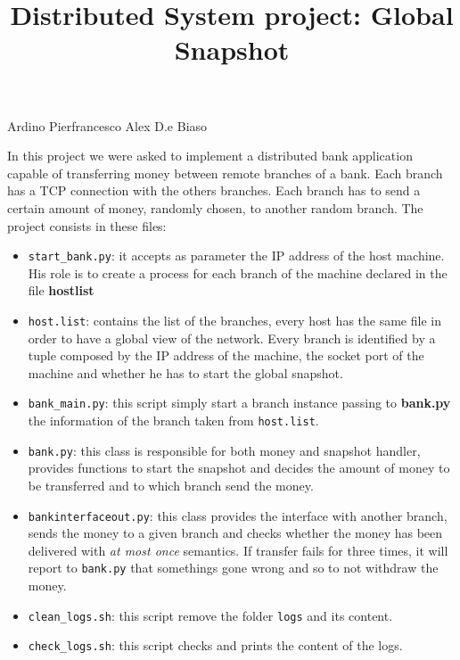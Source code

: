 \documentclass{article}
\begin{document}
\title{Distributed System project: Global Snapshot}
\maketitle
\begin{center}
Ardino Pierfrancesco Alex D.e Biaso\\

    \vspace{1cm}
\end{center}

In this project we were asked to implement a distributed bank application capable of transferring money between remote branches of a bank. Each branch has a TCP connection with the others branches. Each branch has to send a certain amount of money, randomly chosen, to another random branch.
The project consists in these files:

\begin{itemize}
    \item \texttt{start\_bank.py}: it accepts as parameter the IP address of the host machine. His role is to create a process for each branch of the machine declared in the file \textbf{hostlist}
    \item \texttt{host.list}: contains the list of the branches, every host has the same file in order to have a global view of the network. Every branch is identified by a tuple composed by the IP address of the machine, the socket port of the machine and whether he has to start the global snapshot.
    \item \texttt{bank\_main.py}: this script simply start a branch instance passing to \textbf{bank.py} the information of the branch taken from \texttt{host.list}.
    \item \texttt{bank.py}: this class is responsible for both money and snapshot handler, provides functions to start the snapshot and decides the amount of money to be transferred and to which branch send the money.
    \item \texttt{bankinterfaceout.py}: this class provides the interface with another branch, sends the money to a given branch and checks whether the money has been delivered with \emph{at most once} semantics. If transfer fails for three times, it will report to \texttt{bank.py} that somethings gone wrong and so to not withdraw the money.
    \item \texttt{clean\_logs.sh}: this script remove the folder \texttt{logs} and its content.
    \item \texttt{check\_logs.sh}: this script checks and prints the content of the logs.
\end{itemize}
\end{document}
